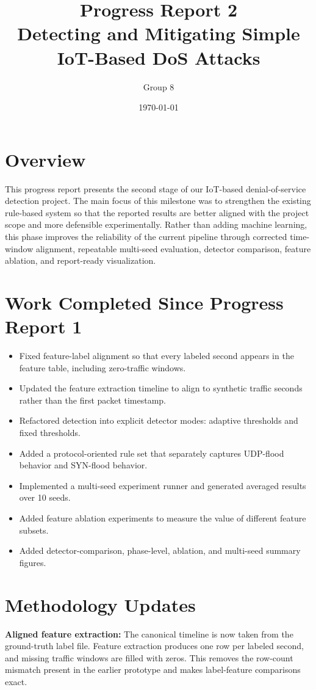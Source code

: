 \documentclass[11pt]{article}
\title{Progress Report 2\\Detecting and Mitigating Simple IoT-Based DoS Attacks}
\author{Group 8}
\date{\today}
\begin{document}
\maketitle

\section*{Overview}
This progress report presents the second stage of our IoT-based denial-of-service detection project.
The main focus of this milestone was to strengthen the existing rule-based system so that the
reported results are better aligned with the project scope and more defensible experimentally.
Rather than adding machine learning, this phase improves the reliability of the current pipeline
through corrected time-window alignment, repeatable multi-seed evaluation, detector comparison,
feature ablation, and report-ready visualization.

\section*{Work Completed Since Progress Report 1}
\begin{itemize}
  \item Fixed feature-label alignment so that every labeled second appears in the feature table, including zero-traffic windows.
  \item Updated the feature extraction timeline to align to synthetic traffic seconds rather than the first packet timestamp.
  \item Refactored detection into explicit detector modes: adaptive thresholds and fixed thresholds.
  \item Added a protocol-oriented rule set that separately captures UDP-flood behavior and SYN-flood behavior.
  \item Implemented a multi-seed experiment runner and generated averaged results over 10 seeds.
  \item Added feature ablation experiments to measure the value of different feature subsets.
  \item Added detector-comparison, phase-level, ablation, and multi-seed summary figures.
\end{itemize}

\section*{Methodology Updates}
\textbf{Aligned feature extraction:}
The canonical timeline is now taken from the ground-truth label file. Feature extraction produces
one row per labeled second, and missing traffic windows are filled with zeros. This removes the
row-count mismatch present in the earlier prototype and makes label-feature comparisons exact.
\end{document}
